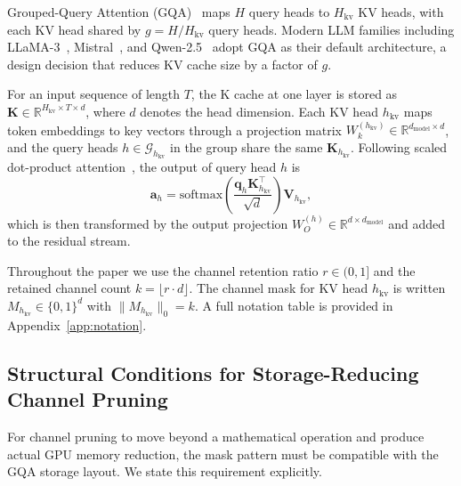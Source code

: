 \documentclass{article}
\begin{document}
Grouped-Query Attention (GQA)~\citep{gqa} maps $H$ query heads to $H_{\mathrm{kv}}$ KV heads, with each KV head shared by $g = H / H_{\mathrm{kv}}$ query heads. Modern LLM families including LLaMA-3~\citep{llama3}, Mistral~\citep{mistral}, and Qwen-2.5~\citep{qwen25} adopt GQA as their default architecture, a design decision that reduces KV cache size by a factor of $g$.
 
For an input sequence of length $T$, the K cache at one layer is stored as $\mathbf{K} \in \mathbb{R}^{H_{\mathrm{kv}} \times T \times d}$, where $d$ denotes the head dimension. Each KV head $h_{\mathrm{kv}}$ maps token embeddings to key vectors through a projection matrix $W_k^{(h_{\mathrm{kv}})} \in \mathbb{R}^{d_{\mathrm{model}} \times d}$, and the query heads $h \in \mathcal{G}_{h_{\mathrm{kv}}}$ in the group share the same $\mathbf{K}_{h_{\mathrm{kv}}}$. Following scaled dot-product attention~\citep{vaswani2017}, the output of query head $h$ is
\begin{equation}
\mathbf{a}_h = \mathrm{softmax}\!\left(\frac{\mathbf{q}_h \mathbf{K}_{h_{\mathrm{kv}}}^\top}{\sqrt{d}}\right) \mathbf{V}_{h_{\mathrm{kv}}},
\end{equation}
which is then transformed by the output projection $W_O^{(h)} \in \mathbb{R}^{d \times d_{\mathrm{model}}}$ and added to the residual stream.
 
Throughout the paper we use the channel retention ratio $r \in (0, 1]$ and the retained channel count $k = \lfloor r \cdot d \rfloor$. The channel mask for KV head $h_{\mathrm{kv}}$ is written $M_{h_{\mathrm{kv}}} \in \{0, 1\}^d$ with $\|M_{h_{\mathrm{kv}}}\|_0 = k$. A full notation table is provided in Appendix~\ref{app:notation}.
 
\subsection{Structural Conditions for Storage-Reducing Channel Pruning}
\label{sec:conditions}
 
For channel pruning to move beyond a mathematical operation and produce actual GPU memory reduction, the mask pattern must be compatible with the GQA storage layout. We state this requirement explicitly.
 
\end{document}
